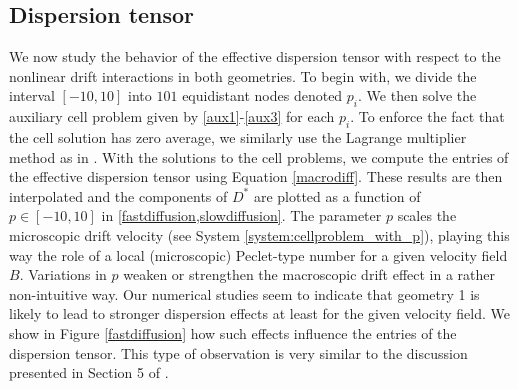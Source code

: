 \documentclass[11pt]{article}
\begin{document}
\subsection{Dispersion tensor}\label{SSec:Influence_on_dispersion}
We now study the behavior of the effective dispersion tensor with respect to the nonlinear drift interactions in both geometries.
To begin with, we divide the interval $[-10, 10]$ into $101$ equidistant nodes denoted $p_i$.
We then solve the auxiliary cell problem given by \eqref{aux1}-\eqref{aux3} for each $p_i$.
  To enforce the fact that the cell solution has zero average, we similarly use the Lagrange multiplier method as in \cite{formaggia2002numerical}.
With the solutions to the cell problems,  we compute the entries of the effective dispersion tensor using Equation \eqref{macrodiff}.
These results are then interpolated and the components of $D^*$ are plotted as a function of $p\in[-10,10]$ in \cref{fastdiffusion,slowdiffusion}.
{The parameter $p$ scales the microscopic drift velocity (see System \eqref{system:cellproblem_with_p}), playing this way the role of a local (microscopic) Peclet-type number for a given velocity field $B$.
Variations in $p$ weaken or strengthen the macroscopic drift effect in a rather non-intuitive way.
Our numerical studies seem to indicate that geometry 1 is likely to lead to stronger dispersion effects at least for the given velocity field.
We show in Figure \ref{fastdiffusion} how such effects influence the entries of the dispersion tensor.
This type of observation is very similar to the discussion presented in Section 5 of \cite{ALLAIRE20102292}.}
%
\end{document}

